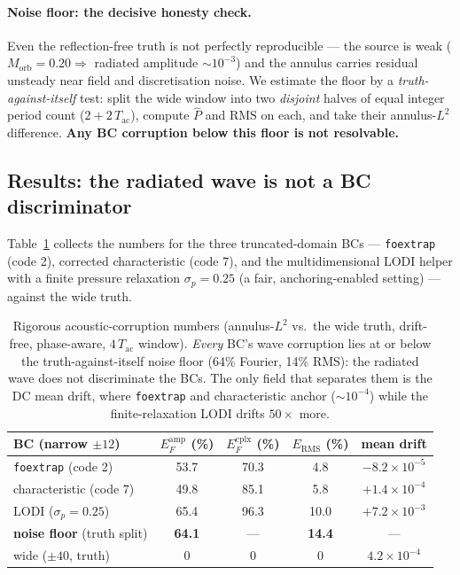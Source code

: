\documentclass[11pt]{article}
\begin{document}
\paragraph{Noise floor: the decisive honesty check.} Even the reflection-free
truth is not perfectly reproducible --- the source is weak
($M_{\text{orb}}=0.20\Rightarrow$ radiated amplitude $\sim10^{-3}$) and the
annulus carries residual unsteady near field and discretisation noise. We
estimate the floor by a \emph{truth-against-itself} test: split the wide window
into two \emph{disjoint} halves of equal integer period count
($2+2\,T_{\text{ac}}$), compute $\hat P$ and $\mathrm{RMS}$ on each, and take
their annulus-$L^2$ difference. \textbf{Any BC corruption below this floor is not
resolvable.}

\subsection{Results: the radiated wave is not a BC discriminator}
Table~\ref{tab:cvp} collects the numbers for the three truncated-domain BCs ---
\texttt{foextrap} (code 2), corrected characteristic (code 7), and the
multidimensional LODI helper with a finite pressure relaxation
$\sigma_p=0.25$ (a fair, anchoring-enabled setting) --- against the wide truth.

\begin{table}[h]\centering
\begin{tabular}{@{}lcccc@{}}
\toprule
BC (narrow $\pm12$) & $E_F^{\text{amp}}$ (\%) & $E_F^{\text{cplx}}$ (\%)
 & $E_{\text{RMS}}$ (\%) & mean drift \\
\midrule
\texttt{foextrap} (code 2)        & 53.7 & 70.3 & 4.8  & $-8.2\times10^{-5}$ \\
characteristic (code 7)           & 49.8 & 85.1 & 5.8  & $+1.4\times10^{-4}$ \\
LODI ($\sigma_p{=}0.25$)          & 65.4 & 96.3 & 10.0 & $+7.2\times10^{-3}$ \\
\midrule
\textbf{noise floor} (truth split)& \textbf{64.1} & --- & \textbf{14.4} & --- \\
wide ($\pm40$, truth)             & 0 & 0 & 0 & $4.2\times10^{-4}$ \\
\bottomrule
\end{tabular}
\caption{Rigorous acoustic-corruption numbers (annulus-$L^2$ vs.\ the wide truth,
drift-free, phase-aware, $4\,T_{\text{ac}}$ window). \emph{Every} BC's wave
corruption lies at or below the truth-against-itself noise floor (64\% Fourier,
14\% RMS): the radiated wave does not discriminate the BCs. The only field that
separates them is the DC mean drift, where \texttt{foextrap} and characteristic
anchor ($\sim10^{-4}$) while the finite-relaxation LODI drifts $50\times$ more.}
\label{tab:cvp}
\end{table}
\end{document}

